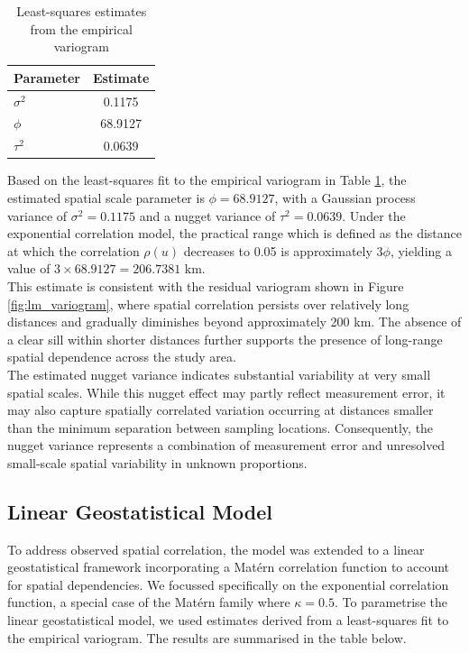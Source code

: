 \documentclass[12pt]{article}
\begin{document}
\begin{table}[htbp]
\centering
\caption{Least-squares estimates from the empirical variogram}
\label{tab:variogram_params}
\begin{tabular}{lc}
\hline
\textbf{Parameter} & \textbf{Estimate} \\
\hline
$\sigma^2$ & 0.1175 \\
$\phi$     & 68.9127 \\
$\tau^2$   & 0.0639 \\
\hline
\end{tabular}
\end{table}


\noindent Based on the least-squares fit to the empirical variogram in Table \ref{tab:variogram_params}, the estimated spatial scale parameter is $\phi = 68.9127$, with a Gaussian process variance of $\sigma^2 = 0.1175$ and a nugget variance of $\tau^2 = 0.0639$. Under the exponential correlation model, the practical range which is defined as the distance at which the correlation $\rho(u)$ decreases to 0.05 is approximately $3\phi$, yielding a value of $3 \times 68.9127 = 206.7381$ km.\\

\noindent This estimate is consistent with the residual variogram shown in Figure \ref{fig:lm_variogram}, where spatial correlation persists over relatively long distances and gradually diminishes beyond approximately 200 km. The absence of a clear sill within shorter distances further supports the presence of long-range spatial dependence across the study area. \\

\noindent The estimated nugget variance indicates substantial variability at very small spatial scales. While this nugget effect may partly reflect measurement error, it may also capture spatially correlated variation occurring at distances smaller than the minimum separation between sampling locations. Consequently, the nugget variance represents a combination of measurement error and unresolved small-scale spatial variability in unknown proportions.

\subsection{Linear Geostatistical Model}
To address observed spatial correlation, the model was extended to a linear geostatistical framework incorporating a Matérn correlation function to account for spatial dependencies. We focussed specifically on the exponential correlation function, a special case of the Matérn family where $\kappa = 0.5$. To parametrise the linear geostatistical model, we used estimates derived from a least-squares fit to the empirical variogram. The results are summarised in the table below.
\end{document}
